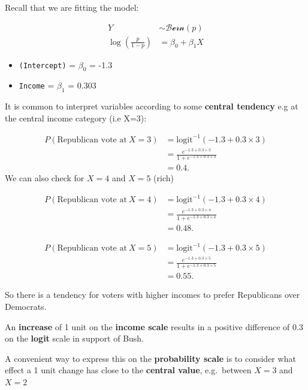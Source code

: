 \documentclass[]{book}
\providecommand{\tightlist}{%
  \setlength{\itemsep}{0pt}\setlength{\parskip}{0pt}}
\theoremstyle{definition}
\theoremstyle{definition}
\theoremstyle{definition}
\theoremstyle{remark}
\begin{document}
Recall that we are fitting the model:

\[
\begin{aligned}
Y  & \sim \mathcal{Bern}(p)\\
\log\left(\frac{p}{1 - p}\right) &  = \beta_0 + \beta_1 X
\end{aligned}
\]

\begin{itemize}
\tightlist
\item
  \texttt{(Intercept)} = \(\beta_0\) = -1.3
\item
  \texttt{Income} = \(\beta_1\) = 0.303
\end{itemize}

It is common to interpret variables according to some \textbf{central
tendency} e.g at the central income category (i.e X=3):

\[
\begin{aligned}
P(\mbox{Republican vote at}~X = 3) &= \mbox{logit}^{-1}\left(-1.3 + 0.3 \times 3\right)\\
&= \frac{e^{-1.3 + 0.3 \times 3}}{1 + e^{-1.3 + 0.3 \times 3}}\\
&= 0.4.
\end{aligned}
\] We can also check for \(X=4\) and \(X=5\) (rich)

\[
\begin{aligned}
P(\mbox{Republican vote at}~X = 4) &= \mbox{logit}^{-1}\left(-1.3 + 0.3 \times 4\right)\\
&= \frac{e^{-1.3 + 0.3 \times 4}}{1 + e^{-1.3 + 0.3 \times 4}}\\
&= 0.48.
\end{aligned}
\]

\[
\begin{aligned}
P(\mbox{Republican vote at}~X = 5) &= \mbox{logit}^{-1}\left(-1.3 + 0.3 \times 5\right)\\
&= \frac{e^{-1.3 + 0.3 \times 5}}{1 + e^{-1.3 + 0.3 \times 5}}\\
&= 0.55.
\end{aligned}
\]

So there is a tendency for voters with higher incomes to prefer
Republicans over Democrats.

An \textbf{increase} of 1 unit on the \textbf{income scale} results in a
positive difference of 0.3 on the \textbf{logit} scale in support of
Bush.

A convenient way to express this on the \textbf{probability scale} is to
consider what effect a 1 unit change has close to the \textbf{central
value}, e.g.~between \(X = 3\) and \(X = 2\)
\end{document}
